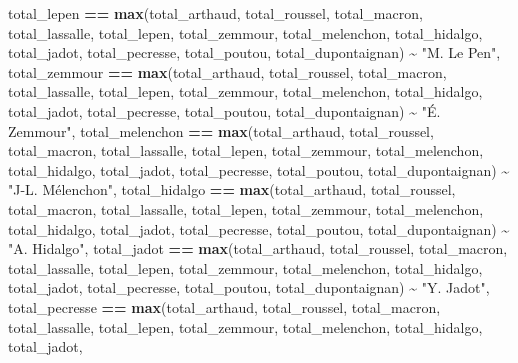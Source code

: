 \documentclass[
]{article}
\newenvironment{Shaded}{\begin{snugshade}}{\end{snugshade}}
\newcommand{\FunctionTok}[1]{\textcolor[rgb]{0.13,0.29,0.53}{\textbf{#1}}}
\newcommand{\NormalTok}[1]{#1}
\newcommand{\SpecialCharTok}[1]{\textcolor[rgb]{0.81,0.36,0.00}{\textbf{#1}}}
\newcommand{\StringTok}[1]{\textcolor[rgb]{0.31,0.60,0.02}{#1}}
\begin{document}
\begin{Shaded}
\begin{Highlighting}[]
\NormalTok{    total\_lepen }\SpecialCharTok{==} \FunctionTok{max}\NormalTok{(total\_arthaud, total\_roussel, total\_macron, }
\NormalTok{                       total\_lassalle, total\_lepen, total\_zemmour, }
\NormalTok{                       total\_melenchon, total\_hidalgo, total\_jadot, }
\NormalTok{                       total\_pecresse, total\_poutou, total\_dupontaignan) }\SpecialCharTok{\textasciitilde{}} \StringTok{"M. Le Pen"}\NormalTok{,}
\NormalTok{    total\_zemmour }\SpecialCharTok{==} \FunctionTok{max}\NormalTok{(total\_arthaud, total\_roussel, total\_macron, }
\NormalTok{                         total\_lassalle, total\_lepen, total\_zemmour, }
\NormalTok{                         total\_melenchon, total\_hidalgo, total\_jadot, }
\NormalTok{                         total\_pecresse, total\_poutou, total\_dupontaignan) }\SpecialCharTok{\textasciitilde{}} \StringTok{"É. Zemmour"}\NormalTok{,}
\NormalTok{    total\_melenchon }\SpecialCharTok{==} \FunctionTok{max}\NormalTok{(total\_arthaud, total\_roussel, total\_macron, }
\NormalTok{                           total\_lassalle, total\_lepen, total\_zemmour, }
\NormalTok{                           total\_melenchon, total\_hidalgo, total\_jadot, }
\NormalTok{                           total\_pecresse, total\_poutou, total\_dupontaignan) }\SpecialCharTok{\textasciitilde{}} \StringTok{"J{-}L. Mélenchon"}\NormalTok{,}
\NormalTok{    total\_hidalgo }\SpecialCharTok{==} \FunctionTok{max}\NormalTok{(total\_arthaud, total\_roussel, total\_macron, }
\NormalTok{                         total\_lassalle, total\_lepen, total\_zemmour, }
\NormalTok{                         total\_melenchon, total\_hidalgo, total\_jadot, }
\NormalTok{                         total\_pecresse, total\_poutou, total\_dupontaignan) }\SpecialCharTok{\textasciitilde{}} \StringTok{"A. Hidalgo"}\NormalTok{,}
\NormalTok{    total\_jadot }\SpecialCharTok{==} \FunctionTok{max}\NormalTok{(total\_arthaud, total\_roussel, total\_macron, }
\NormalTok{                       total\_lassalle, total\_lepen, total\_zemmour, }
\NormalTok{                       total\_melenchon, total\_hidalgo, total\_jadot, }
\NormalTok{                       total\_pecresse, total\_poutou, total\_dupontaignan) }\SpecialCharTok{\textasciitilde{}} \StringTok{"Y. Jadot"}\NormalTok{,}
\NormalTok{    total\_pecresse }\SpecialCharTok{==} \FunctionTok{max}\NormalTok{(total\_arthaud, total\_roussel, total\_macron, }
\NormalTok{                          total\_lassalle, total\_lepen, total\_zemmour, }
\NormalTok{                          total\_melenchon, total\_hidalgo, total\_jadot, }

\end{Highlighting}
\end{Shaded}
\end{document}
